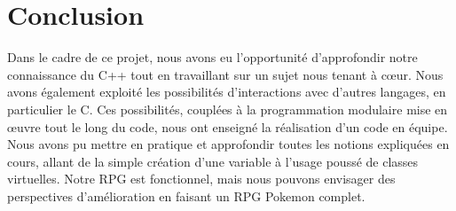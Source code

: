 \vspace*{0.5cm}

\section*{Conclusion}
{}
\vspace*{0.5cm}

Dans le cadre de ce projet, nous avons eu l'opportunité d'approfondir notre connaissance du C++ tout en travaillant sur un sujet nous tenant à cœur. Nous avons également exploité les possibilités d'interactions avec d'autres langages, en particulier le C. Ces possibilités, couplées à la programmation modulaire mise en œuvre tout le long du code, nous ont enseigné la réalisation d'un code en équipe. Nous avons pu mettre en pratique et approfondir toutes les notions expliquées en cours, allant de la simple création d'une variable à l'usage poussé de classes virtuelles. Notre RPG est fonctionnel, mais nous pouvons envisager des perspectives d'amélioration en faisant un RPG Pokemon complet.